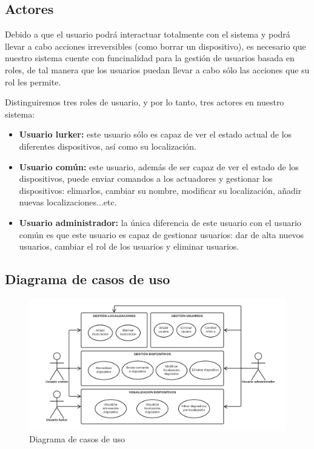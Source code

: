 \subsection{Actores}
Debido a que el usuario podrá interactuar totalmente con el sistema y podrá llevar a cabo acciones irreversibles (como borrar un dispositivo), es necesario
que nuestro sistema cuente con funcinalidad para la gestión de usuarios basada en roles, de tal manera que los usuarios puedan llevar a cabo sólo las acciones
que su rol les permite.
\par
Distinguiremos tres roles de usuario, y por lo tanto, tres actores en nuestro sistema:
\begin{itemize}
\setlength\itemsep{6pt plus 1pt minus 1pt}
\item \textbf{Usuario lurker:} este usuario sólo es capaz de ver el estado actual de los diferentes dispositivos, así como su localización.
\item \textbf{Usuario común:} este usuario, además de ser capaz de ver el estado de los dispositivos, puede enviar comandos a los actuadores y gestionar
los dispositivos: elimarlos, cambiar su nombre, modificar su localización, añadir nuevas localizaciones...etc.
\item \textbf{Usuario administrador:} la única diferencia de este usuario con el usuario común es que este usuario es capaz de gestionar usuarios: dar de alta
nuevos usuarios, cambiar el rol de los usuarios y eliminar usuarios.
\end{itemize}
\subsection{Diagrama de casos de uso}

\begin{figure}[H]
\centering
\includegraphics[width=7.00in]{images/casos_uso.png}
\caption{Diagrama de casos de uso}
\label{fig:casos_uso}
\end{figure}

